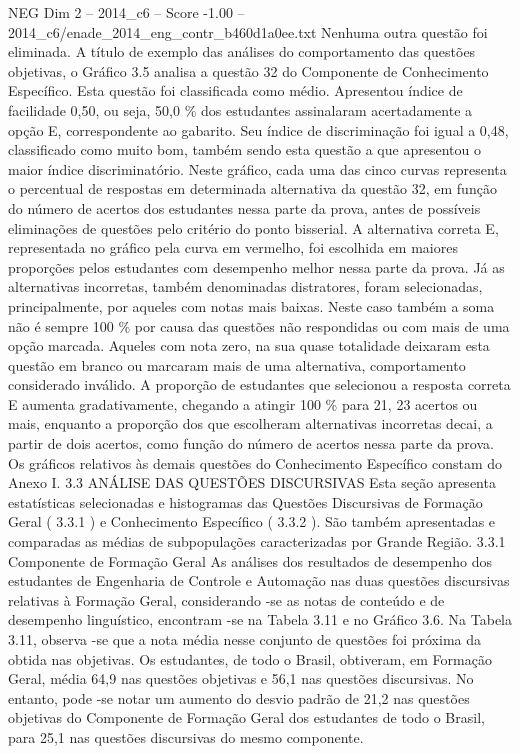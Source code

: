 \begin{textsample}{NEG Dim 2 – 2014\_c6 – Score -1.00 – 2014\_c6/enade\_2014\_eng\_contr\_b460d1a0ee.txt}
Nenhuma outra questão foi eliminada.
A título de exemplo das análises do comportamento das questões objetivas, o Gráfico 3.5 analisa a questão 32 do Componente de Conhecimento Específico.
Esta questão foi classificada como médio.
Apresentou índice de facilidade 0,50, ou seja, 50,0 \% dos estudantes assinalaram acertadamente a opção E, correspondente ao gabarito.
Seu índice de discriminação foi igual a 0,48, classificado como muito bom, também sendo esta questão a que apresentou o maior índice discriminatório.
Neste gráfico, cada uma das cinco curvas representa o percentual de respostas em determinada alternativa da questão 32, em função do número de acertos dos estudantes nessa parte da prova, antes de possíveis eliminações de questões pelo critério do ponto bisserial.
A alternativa correta E, representada no gráfico pela curva em vermelho, foi escolhida em maiores proporções pelos estudantes com desempenho melhor nessa parte da prova.
Já as alternativas incorretas, também denominadas distratores, foram selecionadas, principalmente, por aqueles com notas mais baixas.
Neste caso também a soma não é sempre 100 \% por causa das questões não respondidas ou com mais de uma opção marcada.
Aqueles com nota zero, na sua quase totalidade deixaram esta questão em branco ou marcaram mais de uma alternativa, comportamento considerado inválido.
A proporção de estudantes que selecionou a resposta correta E aumenta gradativamente, chegando a atingir 100 \% para 21, 23 acertos ou mais, enquanto a proporção dos que escolheram alternativas incorretas decai, a partir de dois acertos, como função do número de acertos nessa parte da prova.
Os gráficos relativos às demais questões do Conhecimento Específico constam do Anexo I. 3.3 ANÁLISE DAS QUESTÕES DISCURSIVAS Esta seção apresenta estatísticas selecionadas e histogramas das Questões Discursivas de Formação Geral ( 3.3.1 ) e Conhecimento Específico ( 3.3.2 ).
São também apresentadas e comparadas as médias de subpopulações caracterizadas por Grande Região. 3.3.1 Componente de Formação Geral As análises dos resultados de desempenho dos estudantes de Engenharia de Controle e Automação nas duas questões discursivas relativas à Formação Geral, considerando -se as notas de conteúdo e de desempenho linguístico, encontram -se na Tabela 3.11 e no Gráfico 3.6.
Na Tabela 3.11, observa -se que a nota média nesse conjunto de questões foi próxima da obtida nas objetivas.
Os estudantes, de todo o Brasil, obtiveram, em Formação Geral, média 64,9 nas questões objetivas e 56,1 nas questões discursivas.
No entanto, pode -se notar um aumento do desvio padrão de 21,2 nas questões objetivas do Componente de Formação Geral dos estudantes de todo o Brasil, para 25,1 nas questões discursivas do mesmo componente.

\end{textsample}

